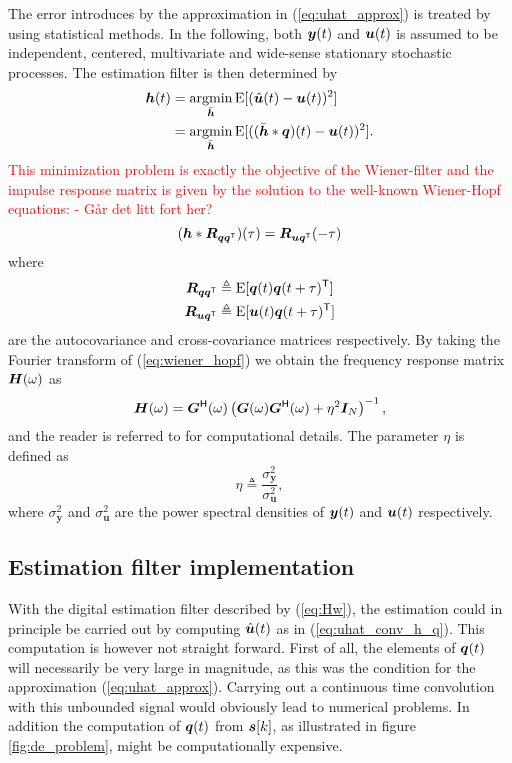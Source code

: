 The error introduces by the approximation in (\ref{eq:uhat_approx}) is treated by using statistical methods. In the following, both $\bm{y}(t)$ and $\bm{u}(t)$ is assumed to be independent, centered, multivariate and wide-sense stationary stochastic processes. The estimation filter is then determined by
\begin{align}
    \bm{h}(t)    & = \operatorname*{argmin}_{\bar{\bm{h}}} \text{E}[(\hat{\bm{u}}(t) - \bm{u}(t))^2] \\
            & = \operatorname*{argmin}_{\bar{\bm{h}}} \text{E}[((\bar{\bm{h}}*\bm{q})(t) - \bm{u}(t))^2].
\end{align}
\textcolor{red}{This minimization problem is exactly the objective of the Wiener-filter \cite{optimal_filtering} and the impulse response matrix is given by the solution to the well-known Wiener-Hopf equations: - Går det litt fort her?}
\begin{equation}
    \label{eq:wiener_hopf}
    (\bm{h}* \bm{R}_{\bm{q}\bm{q}^\mathsf{T}})(\tau) = \bm{R}_{\bm{u}\bm{q}^\mathsf{T}}(-\tau)
\end{equation}
where
\begin{align}
    \bm{R}_{\bm{q}\bm{q}^\mathsf{T}} & \triangleq \text{E}[\bm{q}(t)\bm{q}(t+\tau)^\mathsf{T}] \\
    \bm{R}_{\bm{u}\bm{q}^\mathsf{T}} & \triangleq \text{E}[\bm{u}(t)\bm{q}(t+\tau)^\mathsf{T}]
\end{align}
are the autocovariance and cross-covariance matrices respectively. By taking the Fourier transform of (\ref{eq:wiener_hopf}) we obtain the frequency response matrix $\bm{H}(\omega)$ as
\begin{equation}
    \label{eq:Hw}
    \bm{H}(\omega) = \bm{G}^\mathsf{H}(\omega) \left( \bm{G}(\omega)\bm{G}^\mathsf{H}(\omega) + \eta^2\bm{I}_N \right)^{-1},
\end{equation}
and the reader is referred to \cite{malmberg_thesis} for computational details.
The parameter $\eta$ is defined as
\begin{equation}
    \label{eq:def_eta}
    \eta \triangleq \frac{\sigma_{\bm{y}}^2}{\sigma_{\bm{u}}^2},
\end{equation}
where $\sigma_{\bm{y}}^2$ and $\sigma_{\bm{u}}^2$ are the power spectral densities of $\bm{y}(t)$ and $\bm{u}(t)$ respectively.




\subsection{Estimation filter implementation}
With the digital estimation filter described by (\ref{eq:Hw}), the estimation could in principle be carried out by computing $\hat{\bm{u}}(t)$ as in (\ref{eq:uhat_conv_h_q}). This computation is however not straight forward. First of all, the elements of $\bm{q}(t)$ will necessarily be very large in magnitude, as this was the condition for the approximation (\ref{eq:uhat_approx}). Carrying out a continuous time convolution with this unbounded signal would obviously lead to numerical problems. In addition the computation of $\bm{q}(t)$ from $\bm{s}[k]$, as illustrated in figure \ref{fig:de_problem}, might be computationally expensive.

